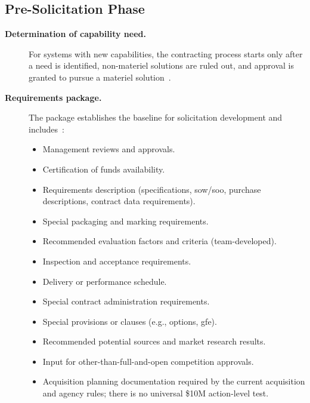 \documentclass[../main.tex]{subfiles}
\begin{document}
\subsection{Pre-Solicitation Phase}
\begin{description}
  \item[\textbf{Determination of capability need.}] For systems with new capabilities, the contracting process starts only after a need is identified, non-materiel solutions are ruled out, and approval is granted to pursue a materiel solution~\autocite{edo-3-2-2-solicitation-prep-2025}.
  \item[\textbf{Requirements package.}] The package establishes the baseline for solicitation development and includes~\autocite{edo-3-2-2-solicitation-prep-2025}:
        \begin{itemize}
          \item Management reviews and approvals.
          \item Certification of funds availability.
          \item Requirements description (specifications, \ac{sow}/\ac{soo}, purchase descriptions, contract data requirements).
          \item Special packaging and marking requirements.
          \item Recommended evaluation factors and criteria (team-developed).
          \item Inspection and acceptance requirements.
          \item Delivery or performance schedule.
          \item Special contract administration requirements.
          \item Special provisions or clauses (e.g., options, \ac{gfe}).
          \item Recommended potential sources and market research results.
          \item Input for other-than-full-and-open competition approvals.
          \item Acquisition planning documentation required by the current acquisition and agency rules; there is no universal \$10M action-level test.
        \end{itemize}
\end{description}

\end{document}
